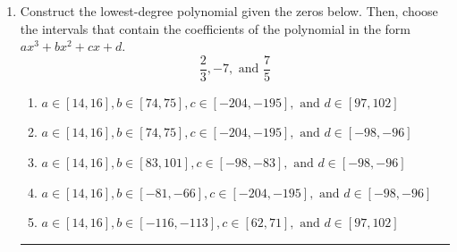 \documentclass[14pt]{extbook}
\newcommand{\litem}[1]{\item#1\hspace*{-1cm}\rule{\textwidth}{0.4pt}}
\begin{document}
\begin{enumerate}
\litem{
Construct the lowest-degree polynomial given the zeros below. Then, choose the intervals that contain the coefficients of the polynomial in the form $ax^3+bx^2+cx+d$.\[ \frac{2}{3}, -7, \text{ and } \frac{7}{5} \]\begin{enumerate}[label=\Alph*.]
\item \( a \in [14, 16], b \in [74, 75], c \in [-204, -195], \text{ and } d \in [97, 102] \)
\item \( a \in [14, 16], b \in [74, 75], c \in [-204, -195], \text{ and } d \in [-98, -96] \)
\item \( a \in [14, 16], b \in [83, 101], c \in [-98, -83], \text{ and } d \in [-98, -96] \)
\item \( a \in [14, 16], b \in [-81, -66], c \in [-204, -195], \text{ and } d \in [-98, -96] \)
\item \( a \in [14, 16], b \in [-116, -113], c \in [62, 71], \text{ and } d \in [97, 102] \)


\end{enumerate}}
\end{enumerate}
\end{document}
